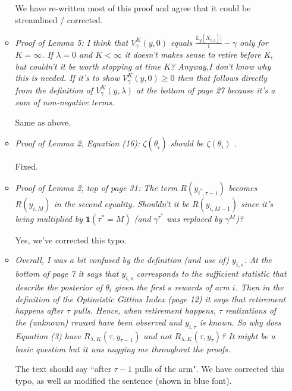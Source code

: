 \documentclass[11pt]{article}
\newcommand{\1}{\ensuremath{\mathbf{1}}} %
\theoremstyle{thm-sf}
\begin{document}
\begin{enumerate}
\begin{itemize}
			 We have re-written most of this proof and agree that it could be streamlined / corrected.
			 
			 \item {\it Proof of Lemma 5: I think that $V^{K}_\gamma(y, 0)$ equals $\frac{\mathbb E_y[X_{i,1}]|}1-\gamma$ only for $K = \infty$. If $\lambda = 0$ and $K < \infty$ it doesn't makes sense to retire before K, but couldn't it be worth stopping at time $K$? Anyway,I don't know why this is needed. If it's to show $V^{K}_\gamma(y, 0) \geq 0$ then that follows directly from the definition of $V^{K}_\gamma(y, \lambda)$ at the bottom of page 27 because it's a sum of non-negative terms.}
			 
			 Same as above.
			 
			 \item {\it Proof of Lemma 2, Equation (16): $\zeta(\hat \theta_i)$ should be $\zeta(\theta_i)$ .}
			 
			 Fixed.
			 
			 \item {\it 
			 	Proof of Lemma 2, top of page 31: The term  $R(y_{i^*, \tau - 1})$ becomes $R(y_{i,M})$ in the second equality. Shouldn't it be $R(y_{i,M-1})$ since it's being multiplied by $\mathbf 1(\tau^* = M)$ (and $\gamma^{\tau^*}$ was replaced by $\gamma^M$)?
			 }
			 
			 Yes, we've corrected this typo.
		 
		 	\item {\it Overall, I was a bit confused by the definition (and use of) $y_{i,s}$. At the bottom of page 7 it says that $y_{i,s}$ corresponds to the sufficient statistic that describe the posterior of $\theta_i$ given the first $s$ rewards of arm $i$. Then in the definition of the Optimistic Gittins Index (page 12) it says that retirement happens after $\tau$ pulls. Hence, when retirement happens, $\tau$ realizations of the (unknown) reward have been observed and $y_{i,\tau}$ is known. 
		 		So why does Equation (3) have $R_{\lambda,K}(\tau, y_{\tau-1})$ and not $R_{\lambda,K}(\tau, y_{\tau})$? It might be a basic question but it was nagging me throughout the proofs.
	 		}
	 		
	 		The text should say ``after $\tau -1$ pulls of the arm". We have corrected this typo, as well as modified the sentence (shown in blue font).
			 
			 
		\end{itemize}
	
	\end{enumerate}
\end{document}
